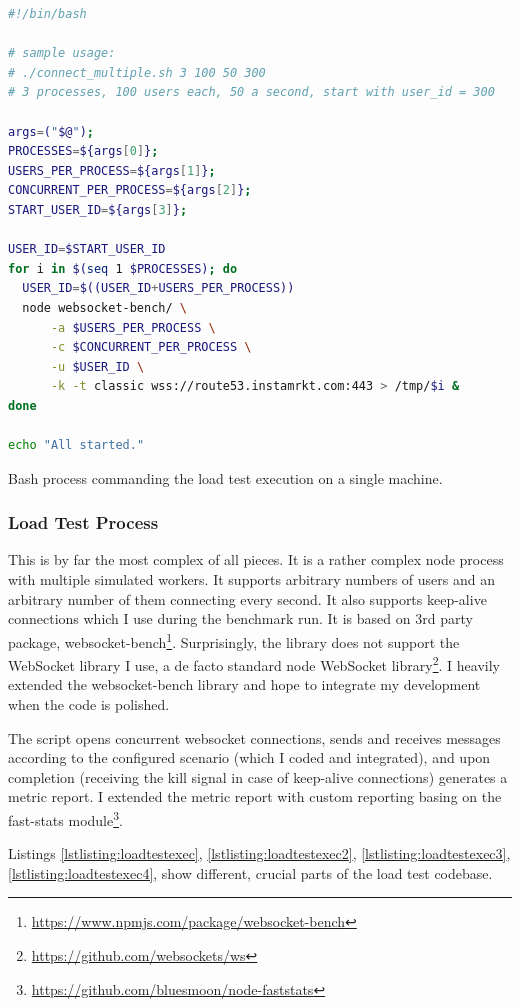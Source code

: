 \documentclass{uvamscse}
\begin{document}
\begin{sourcecode}[H]
\begin{lstlisting}[style=mono, language=bash]
#!/bin/bash

# sample usage:
# ./connect_multiple.sh 3 100 50 300
# 3 processes, 100 users each, 50 a second, start with user_id = 300

args=("$@");
PROCESSES=${args[0]};
USERS_PER_PROCESS=${args[1]};
CONCURRENT_PER_PROCESS=${args[2]};
START_USER_ID=${args[3]};

USER_ID=$START_USER_ID
for i in $(seq 1 $PROCESSES); do
  USER_ID=$((USER_ID+USERS_PER_PROCESS))
  node websocket-bench/ \
      -a $USERS_PER_PROCESS \
      -c $CONCURRENT_PER_PROCESS \
      -u $USER_ID \
      -k -t classic wss://route53.instamrkt.com:443 > /tmp/$i &
done

echo "All started."

\end{lstlisting}
\caption{Bash process commanding the load test execution on a single machine.}
\label{lstlisting:bashloadtest}
\end{sourcecode}


\subsubsection{Load Test Process}
This is by far the most complex of all pieces. It is a rather complex node process with multiple simulated workers. It supports arbitrary numbers of users and an arbitrary number of them connecting every second. It also supports keep-alive connections which I use during the benchmark run. It is based on 3rd party package, websocket-bench\footnote{\url{https://www.npmjs.com/package/websocket-bench}}. Surprisingly, the library does not support the WebSocket library I use, a de facto standard node WebSocket library\footnote{\url{https://github.com/websockets/ws}}. I heavily extended the websocket-bench library and hope to integrate my development when the code is polished.

The script opens concurrent websocket connections, sends and receives messages according to the configured scenario (which I coded and integrated), and upon completion (receiving the kill signal in case of keep-alive connections) generates a metric report. I extended the metric report with custom reporting basing on the fast-stats module\footnote{\url{https://github.com/bluesmoon/node-faststats}}.

Listings \ref{lstlisting:loadtestexec}, \ref{lstlisting:loadtestexec2}, \ref{lstlisting:loadtestexec3}, \ref{lstlisting:loadtestexec4},  show different, crucial parts of the load test codebase.
\end{document}
